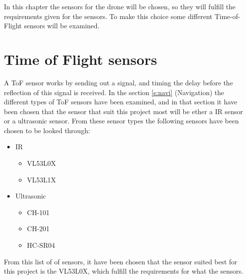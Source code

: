 In this chapter the sensors for the drone will be chosen, so they will fulfill the requirements given for the sensors. To make this choice some different Time-of-Flight sensors will be examined.
\section{Time of Flight sensors}\label{s:sensor_choice}
A ToF sensor works by sending out a signal, and timing the delay before the reflection of this signal is received. In the section \ref{s:navi} (Navigation) the different types of ToF sensors have been examined, and in that section it have been chosen that the sensor that suit this project most will be ether a IR sensor or a ultrasonic sensor. From these sensor types the following sensors have been chosen to be looked through:
\begin{itemize}
    \item IR
    \begin{itemize}
        \item VL53L0X %
        \item VL53L1X 
    \end{itemize}
    \item Ultrasonic
    \begin{itemize}
        \item CH-101
        \item CH-201
        \item HC-SR04
    \end{itemize}
\end{itemize}
From this list of of sensors, it have been chosen that the sensor suited best for this project is the VL53L0X, which fulfill the requirements for what the sensors.

